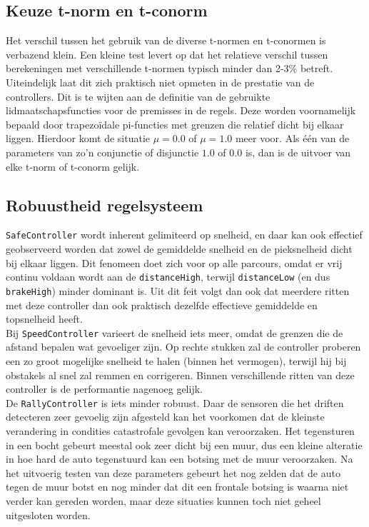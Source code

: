 \documentclass[10pt,a4paper]{article}
\begin{document}
		\subsection{Keuze t-norm en t-conorm}
			Het verschil tussen het gebruik van de diverse t-normen en t-conormen is verbazend klein. Een kleine test levert op dat het relatieve verschil tussen berekeningen met verschillende t-normen typisch minder dan 2-3\% betreft. Uiteindelijk laat dit zich praktisch niet opmeten in de prestatie van de controllers. Dit is te wijten aan de definitie van de gebruikte lidmaatschapsfuncties voor de premisses in de regels. Deze worden voornamelijk bepaald door trapezo\"idale pi-functies met grenzen die relatief dicht bij elkaar liggen. Hierdoor komt de situatie $\mu = 0.0$ of $\mu = 1.0$ meer voor. Als \'e\'en van de parameters van zo'n conjunctie of disjunctie $1.0$ of $0.0$ is, dan is de uitvoer van elke t-norm of t-conorm gelijk.\\

		\subsection{Robuustheid regelsysteem}
			\texttt{SafeController} wordt inherent gelimiteerd op snelheid, en daar kan ook effectief geobserveerd worden dat zowel de gemiddelde snelheid en de pieksnelheid dicht bij elkaar liggen. Dit fenomeen doet zich voor op alle parcours, omdat er vrij continu voldaan wordt aan de \texttt{distanceHigh}, terwijl \texttt{distanceLow} (en dus \texttt{brakeHigh}) minder dominant is. Uit dit feit volgt dan ook dat meerdere ritten met deze controller dan ook praktisch dezelfde effectieve gemiddelde en topsnelheid heeft.\\

			Bij \texttt{SpeedController} varieert de snelheid iets meer, omdat de grenzen die de afstand bepalen wat gevoeliger zijn. Op rechte stukken zal de controller proberen een zo groot mogelijke snelheid te halen (binnen het vermogen), terwijl hij bij obstakels al snel zal remmen en corrigeren. Binnen verschillende ritten van deze controller is de performantie nagenoeg gelijk.\\

			De \texttt{RallyController} is iets minder robuust. Daar de sensoren die het driften detecteren zeer gevoelig zijn afgesteld kan het voorkomen dat de kleinste verandering in condities catastrofale gevolgen kan veroorzaken. Het tegensturen in een bocht gebeurt meestal ook zeer dicht bij een muur, dus een kleine alteratie in hoe hard de auto tegenstuurd kan een botsing met de muur veroorzaken. Na het uitvoerig testen van deze parameters gebeurt het nog zelden dat de auto tegen de muur botst en nog minder dat dit een frontale botsing is waarna niet verder kan gereden worden, maar deze situaties kunnen toch niet geheel uitgesloten worden.\\
\end{document}
